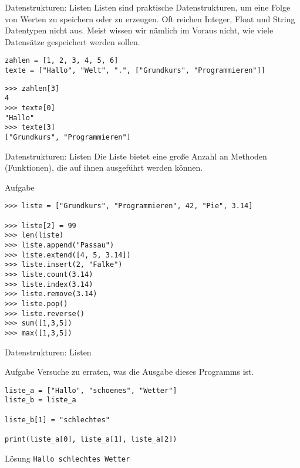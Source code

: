 \begin{frame}[fragile]{Datenstrukturen: Listen}
Listen sind praktische Datenstrukturen, um eine Folge von Werten zu 
speichern oder zu erzeugen.
Oft reichen Integer, Float und String Datentypen nicht aus. Meist wissen wir nämlich im Voraus nicht, 
wie viele Datensätze gespeichert werden sollen.
\pause{}
\begin{lstlisting}
zahlen = [1, 2, 3, 4, 5, 6]
texte = ["Hallo", "Welt", ".", ["Grundkurs", "Programmieren"]]
\end{lstlisting}

\begin{lstlisting}
>>> zahlen[3]
4
>>> texte[0]
"Hallo"
>>> texte[3]
["Grundkurs", "Programmieren"]
\end{lstlisting}
\end{frame}

\begin{frame}[fragile]{Datenstrukturen: Listen}
Die Liste bietet eine große Anzahl an Methoden (Funktionen), die auf ihnen
ausgeführt werden können.
\begin{block}{Aufgabe}
\begin{lstlisting}
>>> liste = ["Grundkurs", "Programmieren", 42, "Pie", 3.14]

>>> liste[2] = 99
>>> len(liste)
>>> liste.append("Passau")
>>> liste.extend([4, 5, 3.14])
>>> liste.insert(2, "Falke")
>>> liste.count(3.14)
>>> liste.index(3.14)
>>> liste.remove(3.14)
>>> liste.pop()
>>> liste.reverse()
>>> sum([1,3,5])
>>> max([1,3,5])
\end{lstlisting}
\end{block}
\end{frame}

\begin{frame}[fragile]{Datenstrukturen: Listen}
\begin{block}{Aufgabe}
Versuche zu erraten, was die Ausgabe dieses Programms ist.
\end{block}

\begin{lstlisting}
liste_a = ["Hallo", "schoenes", "Wetter"]
liste_b = liste_a

liste_b[1] = "schlechtes"

print(liste_a[0], liste_a[1], liste_a[2])  
\end{lstlisting}
\pause{}
\begin{exampleblock}{Lösung}
    \texttt{Hallo schlechtes Wetter}
\end{exampleblock}
\end{frame}

